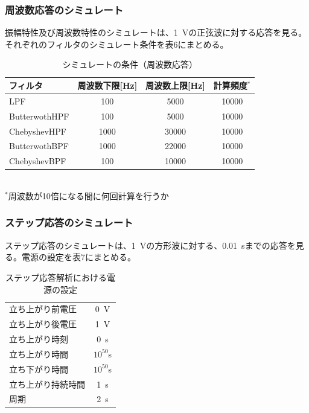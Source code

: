 \documentclass[10pt,a4j,dvipdfmx]{jsarticle}
\begin{document}
\subsubsection{周波数応答のシミュレート}
振幅特性及び周波数特性のシミュレートは、\SI{1}{\volt}の正弦波に対する応答を見る。
それぞれのフィルタのシミュレート条件を表6にまとめる。

\begin{table}[htb]
  \begin{center}
    \caption{シミュレートの条件（周波数応答）}
    \begin{tabular}{|l||c|c|c|} \hline
      フィルタ & 周波数下限[\si{\hertz}] & 周波数上限[\si{\hertz}] & 計算頻度$^*$\\ \hline \hline
      LPF & 100 & 5000 & 10000\\
      ButterwothHPF & 100 & 5000 & 10000 \\ 
      ChebyshevHPF & 1000 & 30000 & 10000 \\ 
      ButterwothBPF & 1000 & 22000 & 10000 \\ 
      ChebyshevBPF & 100 & 10000 & 10000 \\ 
      \hline
    \end{tabular}
    \\ $^*$周波数が10倍になる間に何回計算を行うか
  \end{center}
\end{table}

\subsubsection{ステップ応答のシミュレート}
ステップ応答のシミュレートは、\SI{1}{\volt}の方形波に対する、\SI{0.01}{\second}までの応答を見る。電源の設定を表7にまとめる。

\begin{table}[htb]
  \begin{center}
    \caption{ステップ応答解析における電源の設定}
    \begin{tabular}{|l||c|} \hline
      立ち上がり前電圧 & \SI{0}{\volt} \\ 
      立ち上がり後電圧 & \SI{1}{\volt} \\
      立ち上がり時刻 & \SI{0}{\second} \\ 
      立ち上がり時間 & $10^{50}$\si{\second} \\ 
      立ち下がり時間 & $10^{50}$\si{\second} \\ 
      立ち上がり持続時間 & \SI{1}{\second} \\
      周期  & \SI{2}{\second} \\
      \hline
    \end{tabular}
  \end{center}
\end{table}
\end{document}
